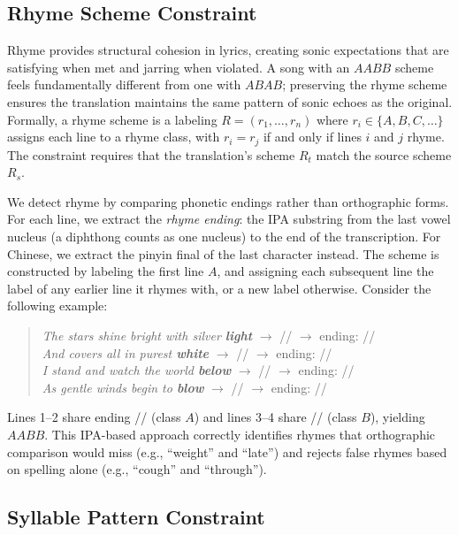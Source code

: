 \documentclass[11pt]{article}
\begin{document}
\subsection{Rhyme Scheme Constraint}
\label{sec:rhyme-scheme}

Rhyme provides structural cohesion in lyrics, creating sonic expectations that are satisfying when met and jarring when violated.
A song with an $AABB$ scheme feels fundamentally different from one with $ABAB$; preserving the rhyme scheme ensures the translation maintains the same pattern of sonic echoes as the original.
Formally, a rhyme scheme is a labeling $R = (r_1, \ldots, r_n)$ where $r_i \in \{A, B, C, \ldots\}$ assigns each line to a rhyme class, with $r_i = r_j$ if and only if lines $i$ and $j$ rhyme.
The constraint requires that the translation's scheme $R_t$ match the source scheme $R_s$.

We detect rhyme by comparing phonetic endings rather than orthographic forms.
For each line, we extract the \emph{rhyme ending}: the IPA substring from the last vowel nucleus (a diphthong counts as one nucleus) to the end of the transcription.
For Chinese, we extract the pinyin final of the last character instead.
The scheme is constructed by labeling the first line $A$, and assigning each subsequent line the label of any earlier line it rhymes with, or a new label otherwise.
Consider the following example:
\begin{quote}
\small
\emph{The stars shine bright with silver \textbf{light}} $\rightarrow$ // $\rightarrow$ ending: // \\
\emph{And covers all in purest \textbf{white}} $\rightarrow$ // $\rightarrow$ ending: // \\
\emph{I stand and watch the world \textbf{below}} $\rightarrow$ // $\rightarrow$ ending: // \\
\emph{As gentle winds begin to \textbf{blow}} $\rightarrow$ // $\rightarrow$ ending: //
\end{quote}
Lines 1--2 share ending // (class $A$) and lines 3--4 share // (class $B$), yielding $AABB$.
This IPA-based approach correctly identifies rhymes that orthographic comparison would miss (e.g., ``weight'' and ``late'') and rejects false rhymes based on spelling alone (e.g., ``cough'' and ``through'').

\subsection{Syllable Pattern Constraint}
\label{sec:syllable-pattern}
\end{document}
